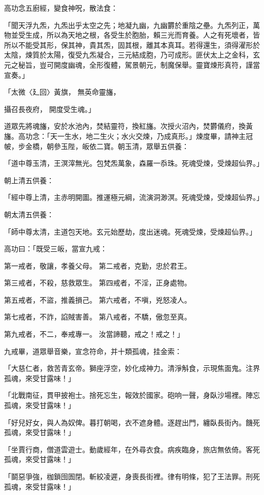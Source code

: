 高功念五廚經，變食神呪，散法食：

「聞天浮九炁，九炁出乎太空之先；地凝九幽，九幽欝於重陰之壘。九炁列正，萬物並受生成，所以為天地之根，各受生於胞胎，賴三光而育養。人之有死壞者，皆所以不能受其形，保其神，貴其炁，固其根，離其本真耳。若得還生，須得濯形於太陰，煉質於太陽，復受九炁凝合，三元結成胞，乃可成形。匪伏太上之金科，玄元之秘旨，豈可開度幽魂，全形復體，駕景朝元，制魔保舉。靈寶煉形真符，謹當宣奏。」

「太微〈廴回〉黃旗，  無英命靈旛，

攝召長夜府，  開度受生魂。」

道眾先將魂旛，安於水池內，焚結靈符，換紅旛。次授火沼內，焚欝儀府，換黃旛。高功念：「天一生水，地二生火；水火交煉，乃成真形。」煉度畢，請神主冠帔，步金橋，朝參玉陛，皈依二寶。朝玉清，眾舉五供養：

「道中尊玉清，王溟滓無光。包梵炁萬象，森羅一忝珠。死魂受煉，受煉超仙界。」

朝上清五供養：

「經中尊上清，主赤明開圖。推運極元綱，流演洞渺溟。死魂受煉，受煉超仙界。」

朝太清五供養：

「師中尊太清，主道包天地。玄元始歷劫，度出迷魂。死魂受煉，受煉超仙界。」

高功曰：「既受三皈，當宣九戒：

第一戒者，敬讓，孝養父母。  第二戒者，克勤，忠於君王。

第三戒者，不殺，慈救眾生。  第四戒者，不淫，正身處物。

第五戒者，不盜，推義損己。  第六戒者，不嗔，兇怒凌人。

第七戒者，不詐，諂賊害善。  第八戒者，不驕，傲忽至真。

第九戒者，不二，奉戒專一。  汝當諦聽，戒之！戒之！」

九戒畢，道眾舉音樂，宣念符命，并十類孤魂，挂金索：

「大慈仁者，救苦青玄帝。獅座浮空，妙化成神力。清淨斛食，示現焦面鬼。注界孤魂，來受甘露味！」

「北戰南征，貫甲披袍士。捨死忘生，報效於國家。砲响一聲，身臥沙場裡。陣忘孤魂，來受甘露味！」

「好兒好女，與人為奴俾。暮打朝喝，衣不遮身體。逐趕出門，纏臥長街內。饑死孤魂，來受甘露味！」

「坐賈行商，僧道雲遊士。動歲經年，在外尋衣食。病疾臨身，旅店無依倚。客死孤魂，來受甘露味！」

「鬬惡爭強，枷鎖囹圄閉。斬絞凌遲，身喪長街裡。律有明條，犯了王法罪。刑死孤魂，來受甘露味！」

